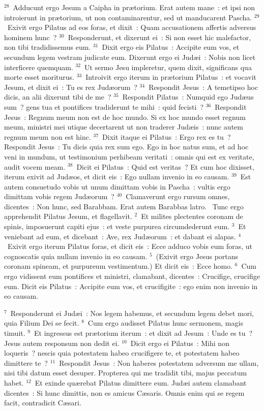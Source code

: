 ${}^{28}$~Adducunt ergo Jesum a Caipha in pr\ae torium. Erat autem mane~: et ipsi non introierunt in pr\ae torium, ut non contaminarentur, sed ut manducarent Pascha.
${}^{29}$~Exivit ergo Pilatus ad eos foras, et dixit~: Quam accusationem affertis adversus hominem hunc~?
${}^{30}$~Responderunt, et dixerunt ei~: Si non esset hic malefactor, non tibi tradidissemus eum.
${}^{31}$~Dixit ergo eis Pilatus~: Accipite eum vos, et secundum legem vestram judicate eum. Dixerunt ergo ei Jud\ae i~: Nobis non licet interficere quemquam.
${}^{32}$~Ut sermo Jesu impleretur, quem dixit, significans qua morte esset moriturus.
${}^{33}$~Introivit ergo iterum in pr\ae torium Pilatus~: et vocavit Jesum, et dixit ei~: Tu es rex Jud\ae orum~?
${}^{34}$~Respondit Jesus~: A temetipso hoc dicis, an alii dixerunt tibi de me~?
${}^{35}$~Respondit Pilatus~: Numquid ego Jud\ae us sum~? gens tua et pontifices tradiderunt te mihi~: quid fecisti~?
${}^{36}$~Respondit Jesus~: Regnum meum non est de hoc mundo. Si ex hoc mundo esset regnum meum, ministri mei utique decertarent ut non traderer Jud\ae is~: nunc autem regnum meum non est hinc.
${}^{37}$~Dixit itaque ei Pilatus~: Ergo rex es tu~? Respondit Jesus~: Tu dicis quia rex sum ego. Ego in hoc natus sum, et ad hoc veni in mundum, ut testimonium perhibeam veritati~: omnis qui est ex veritate, audit vocem meam.
${}^{38}$~Dicit ei Pilatus~: Quid est veritas~? Et cum hoc dixisset, iterum exivit ad Jud\ae os, et dicit eis~: Ego nullam invenio in eo causam.
${}^{39}$~Est autem consuetudo vobis ut unum dimittam vobis in Pascha~: vultis ergo dimittam vobis regem Jud\ae orum~?
${}^{40}$~Clamaverunt ergo rursum omnes, dicentes~: Non hunc, sed Barabbam. Erat autem Barabbas latro.
~Tunc ergo apprehendit Pilatus Jesum, et flagellavit.
${}^{2}$~Et milites plectentes coronam de spinis, imposuerunt capiti ejus~: et veste purpurea circumdederunt eum.
${}^{3}$~Et veniebant ad eum, et dicebant~: Ave, rex Jud\ae orum~: et dabant ei alapas.
${}^{4}$~Exivit ergo iterum Pilatus foras, et dicit eis~: Ecce adduco vobis eum foras, ut cognoscatis quia nullam invenio in eo causam.
${}^{5}$~(Exivit ergo Jesus portans coronam spineam, et purpureum vestimentum.) Et dicit eis~: Ecce homo.
${}^{6}$~Cum ergo vidissent eum pontifices et ministri, clamabant, dicentes~: Crucifige, crucifige eum. Dicit eis Pilatus~: Accipite eum vos, et crucifigite~: ego enim non invenio in eo causam.


${}^{7}$~Responderunt ei Jud\ae i~: Nos legem habemus, et secundum legem debet mori, quia Filium Dei se fecit.
${}^{8}$~Cum ergo audisset Pilatus hunc sermonem, magis timuit.
${}^{9}$~Et ingressus est pr\ae torium iterum~: et dixit ad Jesum~: Unde es tu~? Jesus autem responsum non dedit ei.
${}^{10}$~Dicit ergo ei Pilatus~: Mihi non loqueris~? nescis quia potestatem habeo crucifigere te, et potestatem habeo dimittere te~?
${}^{11}$~Respondit Jesus~: Non haberes potestatem adversum me ullam, nisi tibi datum esset desuper. Propterea qui me tradidit tibi, majus peccatum habet.
${}^{12}$~Et exinde qu\ae rebat Pilatus dimittere eum. Jud\ae i autem clamabant dicentes~: Si hunc dimittis, non es amicus C\ae saris. Omnis enim qui se regem facit, contradicit C\ae sari.


